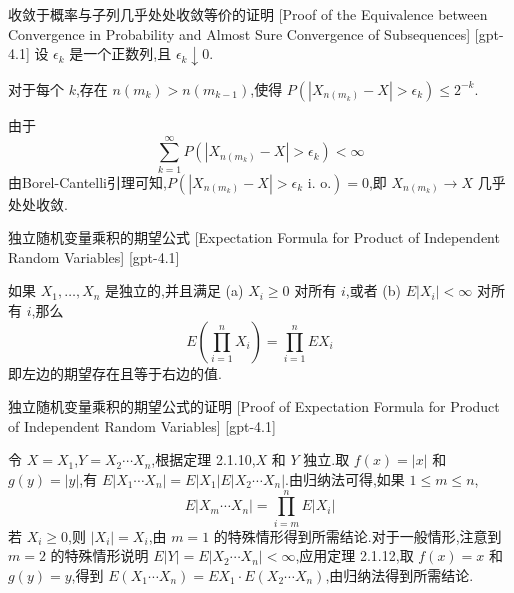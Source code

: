 \documentclass[UTF8]{ctexart}
\begin{document}
    
    
    \begin{prf}
        {收敛于概率与子列几乎处处收敛等价的证明}
        [Proof of the Equivalence between Convergence in Probability and Almost Sure Convergence of Subsequences]
        [gpt-4.1]
        设 $\epsilon_{k}$ 是一个正数列,且 $\epsilon_{k} \downarrow 0$.

对于每个 $k$,存在 $n(m_{k}) > n(m_{k-1})$,使得 $P(|X_{n(m_{k})} - X| > \epsilon_{k}) \leq 2^{-k}$.

由于
\[
\sum_{k=1}^{\infty} P(|X_{n(m_{k})} - X| > \epsilon_{k}) < \infty
\]
由Borel-Cantelli引理可知,$P(|X_{n(m_{k})} - X| > \epsilon_{k} \text{ i. o.}) = 0$,即 $X_{n(m_{k})} \to X$ 几乎处处收敛.
    \end{prf}
    
    
    
    \begin{thm}
        {独立随机变量乘积的期望公式}
        [Expectation Formula for Product of Independent Random Variables]
        [gpt-4.1]
        
如果 $X_{1}, \ldots, X_{n}$ 是独立的,并且满足 (a) $X_{i} \geq 0$ 对所有 $i$,或者 (b) $E|X_{i}| < \infty$ 对所有 $i$,那么
\[
E\left(\prod_{i=1}^{n} X_{i}\right) = \prod_{i=1}^{n} E X_{i}
\]
即左边的期望存在且等于右边的值.

    \end{thm}
    
    
    
    \begin{prf}
        {独立随机变量乘积的期望公式的证明}
        [Proof of Expectation Formula for Product of Independent Random Variables]
        [gpt-4.1]
        
令 $X = X_{1}$,$Y = X_{2} \cdots X_{n}$,根据定理 2.1.10,$X$ 和 $Y$ 独立.取 $f(x) = |x|$ 和 $g(y) = |y|$,有 $E|X_{1} \cdots X_{n}| = E|X_{1}| E|X_{2} \cdots X_{n}|$.由归纳法可得,如果 $1 \leq m \leq n$,
\[
E|X_{m} \cdots X_{n}| = \prod_{i=m}^{n} E|X_{i}|
\]
若 $X_{i} \geq 0$,则 $|X_{i}| = X_{i}$,由 $m = 1$ 的特殊情形得到所需结论.对于一般情形,注意到 $m = 2$ 的特殊情形说明 $E|Y| = E|X_{2} \cdots X_{n}| < \infty$,应用定理 2.1.12,取 $f(x) = x$ 和 $g(y) = y$,得到 $E(X_{1} \cdots X_{n}) = E X_{1} \cdot E(X_{2} \cdots X_{n})$,由归纳法得到所需结论.

    \end{prf}
    
\end{document}
